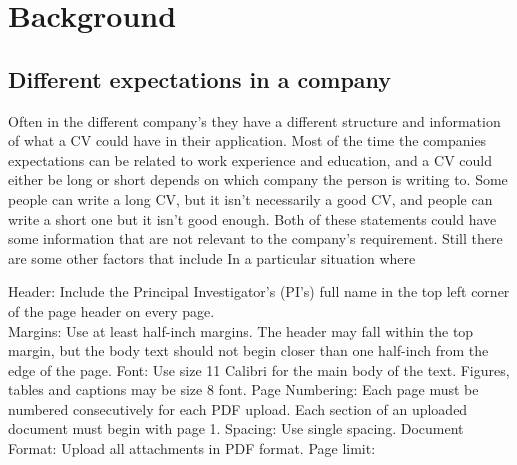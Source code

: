 \section{Background}\label{sec:background}
\subsection{Different expectations in a company}
Often in the different company's they have a different structure and information of what a CV could have in their application.
Most of the time the companies expectations can be related to work experience and education,
and a CV could either be long or short depends on which company the person is writing to. Some people can write a long CV,
but it isn't necessarily a good CV, and people can write a short one but it isn't good enough. 
Both of these statements could have some information that are not relevant to the company's requirement. Still there are some other
factors that include  In a particular situation 
where 

Header: Include the Principal Investigator’s (PI’s) full name in the top left corner of the page header on every page. \\
Margins: Use at least half-inch margins. The header may fall within the top margin, but the body text should not begin closer than one half-inch from the edge of the page.
Font: Use size 11 Calibri for the main body of the text. Figures, tables and captions may be size 8 font.
Page Numbering: Each page must be numbered consecutively for each PDF upload. Each section of an uploaded document must begin with page 1.
Spacing: Use single spacing.
Document Format: Upload all attachments in PDF format.
Page limit: 
